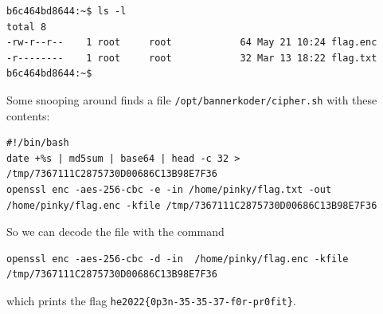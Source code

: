 \begin{fullwidth}
	{\tiny
\begin{verbatim}
b6c464bd8644:~$ ls -l
total 8
-rw-r--r--    1 root     root            64 May 21 10:24 flag.enc
-r--------    1 root     root            32 Mar 13 18:22 flag.txt
b6c464bd8644:~$ 
\end{verbatim}
}
\end{fullwidth}

Some snooping around finds a file \verb+/opt/bannerkoder/cipher.sh+ with these contents:

\begin{fullwidth}
	{\tiny
\begin{verbatim}
#!/bin/bash
date +%s | md5sum | base64 | head -c 32 > /tmp/7367111C2875730D00686C13B98E7F36
openssl enc -aes-256-cbc -e -in /home/pinky/flag.txt -out /home/pinky/flag.enc -kfile /tmp/7367111C2875730D00686C13B98E7F36
\end{verbatim}
}
\end{fullwidth}

So we can decode the file with the command
\begin{fullwidth}
	{\tiny
\begin{verbatim}
openssl enc -aes-256-cbc -d -in  /home/pinky/flag.enc -kfile /tmp/7367111C2875730D00686C13B98E7F36
\end{verbatim}
}
\end{fullwidth}
which prints the flag \verb+he2022{0p3n-35-35-37-f0r-pr0fit}+.
	









